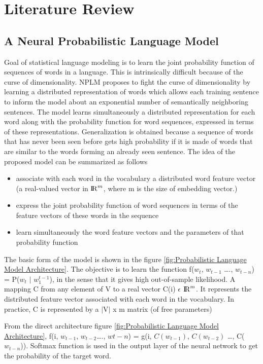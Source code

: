 \chapter{Literature Review}

\section{A Neural Probabilistic Language Model}
Goal of statistical language modeling is to learn the joint probability function of sequences of words in a language. This is intrinsically difficult because of the curse of dimensionality. NPLM proposes to fight the curse of dimensionality by learning a distributed representation of words which allows each training sentence to inform the model about an exponential number of semantically neighboring sentences. The model learns simultaneously a distributed representation for each word along with the probability function for word sequences, expressed in terms of these representations. Generalization is obtained because a sequence of words that has never been seen before gets high probability if it is made of words that are similar to the words forming an already seen sentence. The idea of the proposed model can be summarized as follows

\begin{itemize}
    \item associate with each word in the vocabulary a distributed word feature vector (a real-valued vector in ${\rm I\!R}^m$, where m is the size of embedding vector.)
    \item express the joint probability function of word sequences in terms of the feature vectors of these words in the sequence 
    \item learn simultaneously the word feature vectors and the parameters of that probability function
\end{itemize}

The basic form of the model is shown in the figure \ref{fig:Probabilistic Language Model Architecture}. The objective is to learn the function f($w_t$, $w_{t - 1}$ …., $w_{t - n}$) = P($w_t$ \(|\)  $w_1^{t - 1}$), in the sense that it gives high out-of-sample likelihood. A mapping C from any element of V to a real vector C(i) $\epsilon$ ${\rm I\!R}^m$. It represents the distributed feature vector associated with each word in the vocabulary. In practice, C is represented by a \(|\)V\(|\) x m matrix (of free parameters)

From the direct architecture figure \ref{fig:Probabilistic Language Model Architecture}, 
f(i, $w_{t - 1}$, $w_{t - 2}$…., $w{t - n}$) = g(i, $C(w_{t - 1})$, $C(w_{t - 2})$ …, C($w_{t - n}$)). Softmax function is used in the output layer of the neural network to get the probability of the target word.

